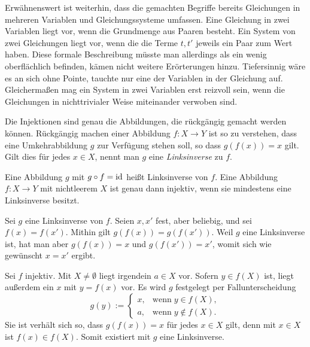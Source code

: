 Erwähnenswert ist weiterhin, dass die gemachten Begriffe bereits
Gleichungen in mehreren Variablen und Gleichungssysteme%
 umfassen. Eine Gleichung in zwei Variablen
liegt vor, wenn die Grundmenge aus Paaren besteht. Ein System von zwei
Gleichungen liegt vor, wenn die die Terme $t,t'$ jeweils ein Paar zum
Wert haben. Diese formale Beschreibung müsste man allerdings als ein
wenig oberflächlich befinden, kämen nicht weitere Erörterungen hinzu.
Tiefersinnig wäre es an sich ohne Pointe, tauchte nur eine der Variablen in
der Gleichung auf. Gleichermaßen mag ein System in zwei Variablen
erst reizvoll sein, wenn die Gleichungen in nichttrivialer Weise
miteinander verwoben sind.

Die Injektionen sind genau die Abbildungen, die rückgängig gemacht
werden können. Rückgängig machen einer Abbildung $f\colon X\to Y$ ist
so zu verstehen, dass eine Umkehrabbildung $g$ zur Verfügung stehen
soll, so dass $g(f(x))=x$ gilt. Gilt dies für jedes $x\in X$, nennt man
$g$ eine \emph{Linksinverse} zu $f$.

\begin{Satz}
Eine Abbildung $g$ mit $g\circ f = \operatorname{id}$ heißt Linksinverse%
 von $f$. Eine Abbildung $f\colon X\to Y$ mit
nichtleerem $X$ ist genau dann injektiv, wenn sie mindestens eine
Linksinverse besitzt.
\end{Satz}
\begin{Beweis}
Sei $g$ eine Linksinverse von $f$. Seien $x,x'$ fest, aber beliebig,
und sei $f(x)=f(x')$. Mithin gilt $g(f(x))=g(f(x'))$. Weil $g$ eine
Linksinverse ist, hat man aber $g(f(x))=x$ und $g(f(x'))=x'$, womit
sich wie gewünscht $x=x'$ ergibt.

Sei $f$ injektiv. Mit $X\ne\emptyset$ liegt irgendein $a\in X$ vor.
Sofern $y\in f(X)$ ist, liegt außerdem ein $x$ mit $y=f(x)$ vor.
Es wird $g$ festgelegt per Fallunterscheidung
\[g(y) := \begin{cases}
x, & \text{wenn}\;y\in f(X),\\
a, & \text{wenn}\;y\notin f(X).
\end{cases}\]
Sie ist verhält sich so, dass $g(f(x))=x$ für jedes $x\in X$ gilt,
denn mit $x\in X$ ist $f(x)\in f(X)$. Somit existiert mit $g$ eine
Linksinverse.\,\qedsymbol
\end{Beweis}

